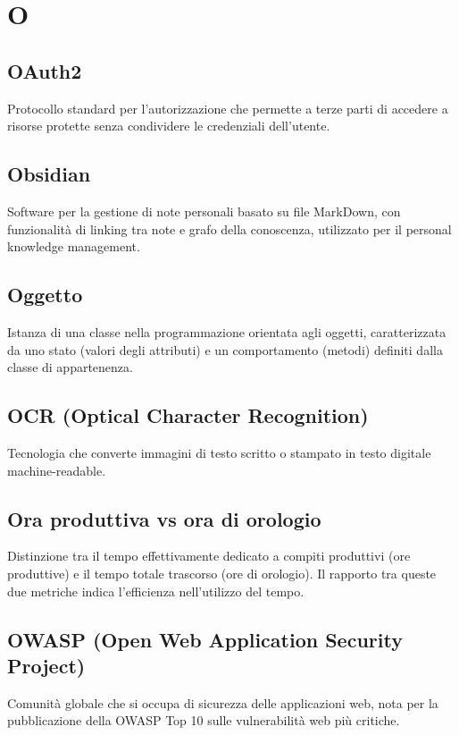 \documentclass[a4paper,11pt]{article}
\begin{document}
\newpage
\section{O}

\subsection{OAuth2}
Protocollo standard per l'autorizzazione che permette a terze parti di accedere a risorse protette senza condividere le credenziali dell'utente.

\subsection{Obsidian}
Software per la gestione di note personali basato su file MarkDown, con funzionalità di linking tra note e grafo della conoscenza, utilizzato per il personal knowledge management.

\subsection{Oggetto}
Istanza di una classe nella programmazione orientata agli oggetti, caratterizzata da uno stato (valori degli attributi) e un comportamento (metodi) definiti dalla classe di appartenenza.

\subsection{OCR (Optical Character Recognition)}
Tecnologia che converte immagini di testo scritto o stampato in testo digitale machine-readable.

\subsection{Ora produttiva vs ora di orologio}
Distinzione tra il tempo effettivamente dedicato a compiti produttivi (ore produttive) e il tempo totale trascorso (ore di orologio). Il rapporto tra queste due metriche indica l'efficienza nell'utilizzo del tempo.

\subsection{OWASP (Open Web Application Security Project)}
Comunità globale che si occupa di sicurezza delle applicazioni web, nota per la pubblicazione della OWASP Top 10 sulle vulnerabilità web più critiche.
\end{document}
